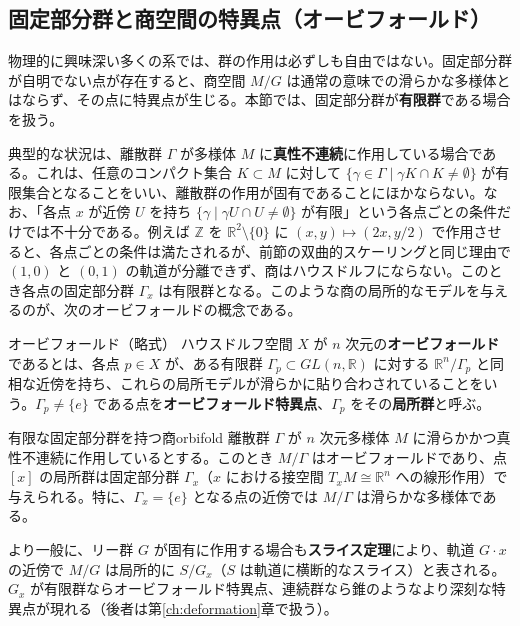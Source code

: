 \documentclass[uplatex, dvipdfmx, book]{jsbook}
\let\origsubsection\subsection
\let\origsubsubsection\subsubsection
\renewcommand{\section}{\origsubsection}
\renewcommand{\subsection}{\origsubsubsection}
\renewcommand{\subsubsection}{\paragraph}
\begin{document}
\section{固定部分群と商空間の特異点（オービフォールド）}

物理的に興味深い多くの系では、群の作用は必ずしも自由ではない。固定部分群が自明でない点が存在すると、商空間 $M/G$ は通常の意味での滑らかな多様体とはならず、その点に特異点が生じる。本節では、固定部分群が\textbf{有限群}である場合を扱う。

典型的な状況は、離散群 $\Gamma$ が多様体 $M$ に\textbf{真性不連続}に作用している場合である。これは、任意のコンパクト集合 $K \subset M$ に対して $\{ \gamma \in \Gamma \mid \gamma K \cap K \neq \emptyset \}$ が有限集合となることをいい、離散群の作用が固有であることにほかならない。なお、「各点 $x$ が近傍 $U$ を持ち $\{ \gamma \mid \gamma U \cap U \neq \emptyset \}$ が有限」という各点ごとの条件だけでは不十分である。例えば $\mathbb{Z}$ を $\mathbb{R}^2 \setminus \{0\}$ に $(x, y) \mapsto (2x, y/2)$ で作用させると、各点ごとの条件は満たされるが、前節の双曲的スケーリングと同じ理由で $(1, 0)$ と $(0, 1)$ の軌道が分離できず、商はハウスドルフにならない。このとき各点の固定部分群 $\Gamma_x$ は有限群となる。このような商の局所的なモデルを与えるのが、次のオービフォールドの概念である。

\begin{mydef}{オービフォールド（略式）}{}
ハウスドルフ空間 $X$ が $n$ 次元の\textbf{オービフォールド}であるとは、各点 $p \in X$ が、ある有限群 $\Gamma_p \subset GL(n, \mathbb{R})$ に対する $\mathbb{R}^n / \Gamma_p$ と同相な近傍を持ち、これらの局所モデルが滑らかに貼り合わされていることをいう。$\Gamma_p \neq \{e\}$ である点を\textbf{オービフォールド特異点}、$\Gamma_p$ をその\textbf{局所群}と呼ぶ。
\end{mydef}

\begin{mythm}{有限な固定部分群を持つ商}{orbifold}
離散群 $\Gamma$ が $n$ 次元多様体 $M$ に滑らかかつ真性不連続に作用しているとする。このとき $M/\Gamma$ はオービフォールドであり、点 $[x]$ の局所群は固定部分群 $\Gamma_x$（$x$ における接空間 $T_x M \cong \mathbb{R}^n$ への線形作用）で与えられる。特に、$\Gamma_x = \{e\}$ となる点の近傍では $M/\Gamma$ は滑らかな多様体である。
\end{mythm}

より一般に、リー群 $G$ が固有に作用する場合も\textbf{スライス定理}により、軌道 $G \cdot x$ の近傍で $M/G$ は局所的に $S/G_x$（$S$ は軌道に横断的なスライス）と表される。$G_x$ が有限群ならオービフォールド特異点、連続群なら錐のようなより深刻な特異点が現れる（後者は第\ref{ch:deformation}章で扱う）。
\end{document}
